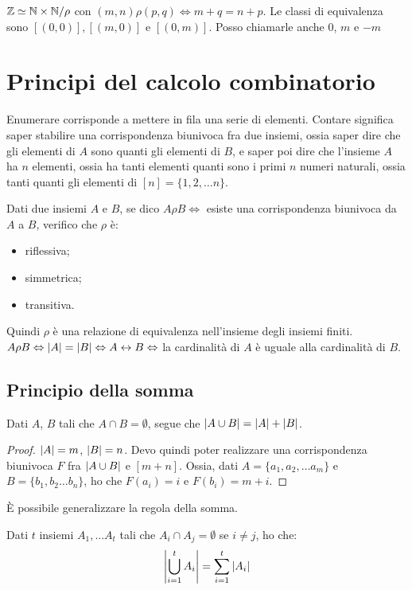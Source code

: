 $\mathbb{Z} \simeq \mathbb{N} \times \mathbb{N} / \rho$ con $(m, n) \rho (p, q) \iff m + q = n + p$. Le classi di equivalenza sono $[(0,0)], [(m,0)]$ e $[(0,m)]$. Posso chiamarle anche 0, $m$ e $-m$

\section{Principi del calcolo combinatorio}

Enumerare corrisponde a mettere in fila una serie di elementi. Contare significa saper stabilire una corrispondenza biunivoca fra due insiemi, ossia saper dire che gli elementi di $A$ sono quanti gli elementi di $B$, e saper poi dire che l'insieme $A$ ha $n$ elementi, ossia ha tanti elementi quanti sono i primi $n$ numeri naturali, ossia tanti quanti gli elementi di $[n] = \{1, 2, \dots n \}$.

Dati due insiemi $A$ e $B$, se dico $A \rho B \iff $ esiste una corrispondenza biunivoca da $A$ a $B$, verifico che $\rho$ \`e:
\begin{itemize}
   \item riflessiva;
   \item simmetrica;
   \item transitiva.
 \end{itemize} 
 Quindi $\rho$ \`e una relazione di equivalenza nell'insieme degli insiemi finiti. $A \rho B \Leftrightarrow \left\lvert{A}\right\rvert = \left\lvert{B}\right\rvert \Leftrightarrow A \leftrightarrow B \Leftrightarrow$ la cardinalit\`a di $A$ \`e uguale alla cardinalit\`a di $B$.

\subsection{Principio della somma}

\begin{prop}
 Dati $A$, $B$ tali che $A \cap B = \emptyset$, segue che $\left\lvert{A \cup B}\right\rvert = \left\lvert{A}\right\rvert + \left\lvert{B}\right\rvert$.
\end{prop}
\begin{proof}
$\left\lvert{A}\right\rvert = m$, $\left\lvert{B}\right\rvert = n$. Devo quindi poter realizzare una corrispondenza biunivoca $F$ fra $\left\lvert{A \cup B}\right\rvert$ e $[m + n]$. Ossia, dati $A = \{ a_1, a_2, \dots a_m\}$ e $B = \{ b_1, b_2 \dots b_n\}$, ho che $F(a_i) = i$ e $F(b_i) = m + i$.
\end{proof}

\`E possibile generalizzare la regola della somma.
\begin{prop}
Dati $t$ insiemi $A_1, \dots A_t$ tali che $A_i \cap A_j = \emptyset$ se $i \neq j$, ho che:
\[
\left\lvert{\bigcup_{i = 1}^{t} A_i}\right\rvert = \sum_{i = 1}^{t} \left\lvert{A_i}\right\rvert
\]
\end{prop}

